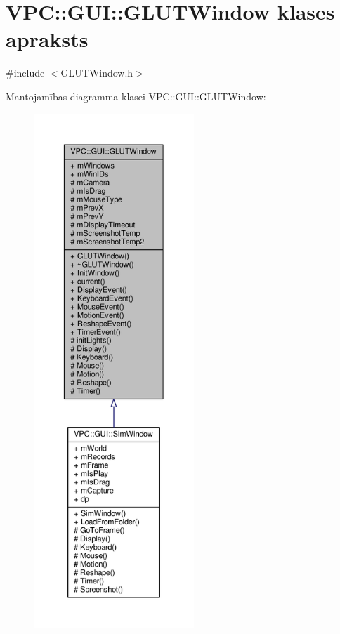 \hypertarget{class_v_p_c_1_1_g_u_i_1_1_g_l_u_t_window}{}\section{V\+PC\+:\+:G\+UI\+:\+:G\+L\+U\+T\+Window klases apraksts}
\label{class_v_p_c_1_1_g_u_i_1_1_g_l_u_t_window}


{\ttfamily \#include $<$G\+L\+U\+T\+Window.\+h$>$}



Mantojamības diagramma klasei V\+PC\+:\+:G\+UI\+:\+:G\+L\+U\+T\+Window\+:
\nopagebreak
\begin{figure}[H]
\begin{center}
\leavevmode
\includegraphics[height=550pt]{class_v_p_c_1_1_g_u_i_1_1_g_l_u_t_window__inherit__graph}
\end{center}
\end{figure}


